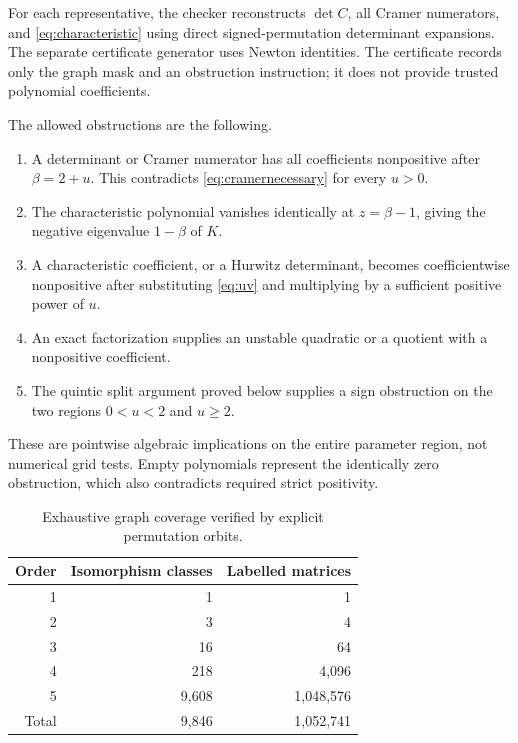 \documentclass[11pt,a4paper]{article}
\theoremstyle{definition}\newtheorem{definition}[theorem]{Definition}
\theoremstyle{remark}\newtheorem{remark}[theorem]{Remark}
\begin{document}
For each representative, the checker reconstructs $\det C$, all Cramer numerators, and \eqref{eq:characteristic} using direct signed-permutation determinant expansions. The separate certificate generator uses Newton identities. The certificate records only the graph mask and an obstruction instruction; it does not provide trusted polynomial coefficients.

The allowed obstructions are the following.
\begin{enumerate}[label=(\roman*)]
\item A determinant or Cramer numerator has all coefficients nonpositive after $\beta=2+u$. This contradicts \eqref{eq:cramernecessary} for every $u>0$.
\item The characteristic polynomial vanishes identically at $z=\beta-1$, giving the negative eigenvalue $1-\beta$ of $K$.
\item A characteristic coefficient, or a Hurwitz determinant, becomes coefficientwise nonpositive after substituting \eqref{eq:uv} and multiplying by a sufficient positive power of $u$.
\item An exact factorization supplies an unstable quadratic or a quotient with a nonpositive coefficient.
\item The quintic split argument proved below supplies a sign obstruction on the two regions $0<u<2$ and $u\geq2$.
\end{enumerate}
These are pointwise algebraic implications on the entire parameter region, not numerical grid tests. Empty polynomials represent the identically zero obstruction, which also contradicts required strict positivity.

\begin{table}[ht]
\centering
\caption{Exhaustive graph coverage verified by explicit permutation orbits.}
\begin{tabular}{rrr}\toprule
Order & Isomorphism classes & Labelled matrices\\\midrule
1&1&1\\2&3&4\\3&16&64\\4&218&4,096\\5&9,608&1,048,576\\\midrule
Total&9,846&1,052,741\\\bottomrule
\end{tabular}
\end{table}
\end{document}
